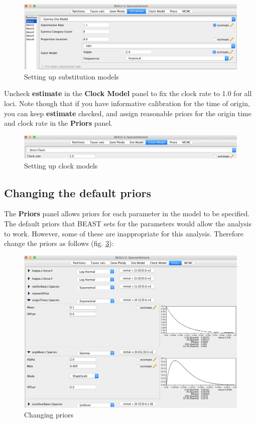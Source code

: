 \documentclass[11pt]{article}
\begin{document}
\begin{figure}[h]
\center
\includegraphics[width=1.0\textwidth]{figs/fig5_sitemodel}
\caption{Setting up substitution models}
\label{fig_sitemodel}
\end{figure}

Uncheck \textbf{estimate} in the \textbf{Clock Model} panel to fix the clock rate to 1.0 for all loci.
Note though that if you have informative calibration for the time of origin, you can keep \textbf{estimate} checked, and assign reasonable priors for the origin time and clock rate in the \textbf{Priors} panel.

\begin{figure}[h]
\center
\includegraphics[width=1.0\textwidth]{figs/fig6_clockmodel}
\caption{Setting up clock models}
\label{fig_clockmodel}
\end{figure}

\subsection*{Changing the default priors}

The \textbf{Priors} panel allows priors for each parameter in the model to be specified. The default priors that BEAST sets for the parameters would allow the analysis to work. However, some of these are inappropriate for this analysis. Therefore change the priors as follows (fig. \ref{fig_priors}):

\begin{figure}[h]
\center
\includegraphics[width=1.0\textwidth]{figs/fig7_priors}
\caption{Changing priors}
\label{fig_priors}
\end{figure}
\end{document}
